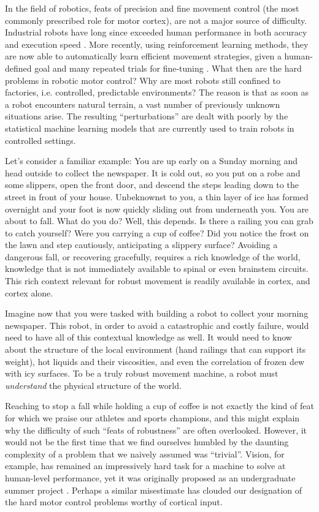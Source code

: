 In the field of robotics, feats of precision and fine movement control (the most commonly prescribed role for motor cortex), are not a major source of difficulty. Industrial robots have long since exceeded human performance in both accuracy and execution speed \cite{Senoo2009}. More recently, using reinforcement learning methods, they are now able to automatically learn efficient movement strategies, given a human-defined goal and many repeated trials for fine-tuning \cite{Coates2008}. What then are the hard problems in robotic motor control? Why are most robots still confined to factories, i.e. controlled, predictable environments? The reason is that as soon as a robot encounters natural terrain, a vast number of previously unknown situations arise. The resulting ``perturbations'' are dealt with poorly by the statistical machine learning models that are currently used to train robots in controlled settings.

Let’s consider a familiar example: You are up early on a Sunday morning and head outside to collect the newspaper. It is cold out, so you put on a robe and some slippers, open the front door, and descend the steps leading down to the street in front of your house. Unbeknownst to you, a thin layer of ice has formed overnight and your foot is now quickly sliding out from underneath you. You are about to fall. What do you do? Well, this depends. Is there a railing you can grab to catch yourself? Were you carrying a cup of coffee? Did you notice the frost on the lawn and step cautiously, anticipating a slippery surface? Avoiding a dangerous fall, or recovering gracefully, requires a rich knowledge of the world, knowledge that is not immediately available to spinal or even brainstem circuits. This rich context relevant for robust movement is readily available in cortex, and cortex alone.

Imagine now that you were tasked with building a robot to collect your morning newspaper. This robot, in order to avoid a catastrophic and costly failure, would need to have all of this contextual knowledge as well. It would need to know about the structure of the local environment (hand railings that can support its weight), hot liquids and their viscosities, and even the correlation of frozen dew with icy surfaces. To be a truly robust movement machine, a robot must \emph{understand} the physical structure of the world.

Reaching to stop a fall while holding a cup of coffee is not exactly the kind of feat for which we praise our athletes and sports champions, and this might explain why the difficulty of such ``feats of robustness'' are often overlooked. However, it would not be the first time that we find ourselves humbled by the daunting complexity of a problem that we naively assumed was ``trivial''. Vision, for example, has remained an impressively hard task for a machine to solve at human-level performance, yet it was originally proposed as an undergraduate summer project \cite{Papert1966}. Perhaps a similar misestimate has clouded our designation of the hard motor control problems worthy of cortical input.

